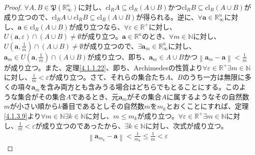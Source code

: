 \documentclass[dvipdfmx]{jsarticle}
\begin{document}
\begin{proof}
$\forall A,B \in \mathfrak{P}\left( \mathbb{R}_{\infty}^{n} \right)$に対し、$\mathrm{cl}_{R}A \subseteq \mathrm{cl}_{R}(A \cup B)$かつ$\mathrm{cl}_{R}B \subseteq \mathrm{cl}_{R}(A \cup B)$が成り立つので、$\mathrm{cl}_{R}A \cup \mathrm{cl}_{R}B \subseteq \mathrm{cl}_{R}(A \cup B)$が得られる。逆に、$\forall\mathbf{a} \in \mathbb{R}_{\infty}^{n}$に対し、$\mathbf{a} \in \mathrm{cl}_{R}(A \cup B)$が成り立つなら、$\forall\varepsilon \in \mathbb{R}^{\mathbf{+}}$に対し、$U\left( \mathbf{a},\varepsilon \right) \cap (A \cup B) \neq \emptyset$が成り立つ。$\mathbf{a} \in \mathbb{R}^{n}$のとき、$\forall m \in \mathbb{N}$に対し、$U\left( \mathbf{a},\frac{1}{m} \right) \cap (A \cup B) \neq \emptyset$が成り立つので、$\exists\mathbf{a}_{m} \in \mathbb{R}_{\infty}^{n}$に対し、$\mathbf{a}_{m} \in U\left( \mathbf{a},\frac{1}{m} \right) \cap (A \cup B)$が成り立つ、即ち、$\mathbf{a}_{m} \in A \cup B$かつ$\left\| \mathbf{a}_{m} - \mathbf{a} \right\| < \frac{1}{m}$が成り立つ。また、定理\ref{4.1.1.22}、即ち、Archimedesの性質より$\forall\varepsilon \in \mathbb{R}^{+}\exists m \in \mathbb{N}$に対し、$\frac{1}{m} < \varepsilon$が成り立つ。さて、それらの集合たち$A$、$B$のうち一方は無限に多くの項々$\mathbf{a}_{m}$を含み両方とも含みうる場合はどちらでもとることにする。このような集合がその集合$A$であるとき、元$\mathbf{a}_{m}$がその集合$A$に属するようなその自然数$m$が小さい順から$k$番目であるとしその自然数$m$を$m_{k}$とおくことにすれば、定理\ref{4.1.3.9}より$\forall m \in \mathbb{N}\exists k \in \mathbb{N}$に対し、$m \leq m_{k}$が成り立つ。$\forall\varepsilon \in \mathbb{R}^{+}\exists m \in \mathbb{N}$に対し、$\frac{1}{m} < \varepsilon$が成り立つのであったから、$\exists k \in \mathbb{N}$に対し、次式が成り立つ。
\begin{align*}
\left\| \mathbf{a}_{m_{k}} - \mathbf{a} \right\| < \frac{1}{m_{k}} \leq \frac{1}{m} < \varepsilon
\end{align*}

\end{proof}
\end{document}
